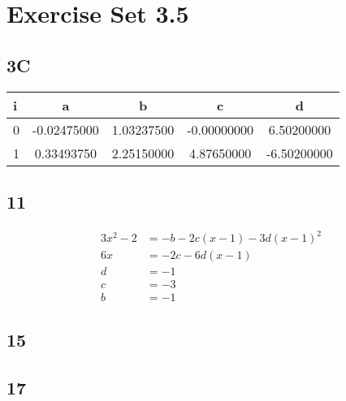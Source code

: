 \documentclass{oisinclass}
\begin{document}
\section*{Exercise Set 3.5}
\subsection*{3C}
\begin{tabular}{l|cccc}
	i & a           & b          & c           & d           \\
	\toprule{}
	0 & -0.02475000 & 1.03237500 & -0.00000000 & 6.50200000  \\
	1 & 0.33493750  & 2.25150000 & 4.87650000  & -6.50200000
\end{tabular}	
\subsection*{11}
\begin{align*}
	3 x^{2} - 2 & = - b - 2 c \left(x - 1\right) - 3 d \left(x - 1\right)^{2} \\
	6 x         & = - 2 c - 6 d \left(x - 1\right)                            \\
	d           & = -1                                                        \\
	c           & = -3                                                        \\
	b           & = -1
\end{align*}
\subsection*{15}
\subsection*{17}
\end{document}
